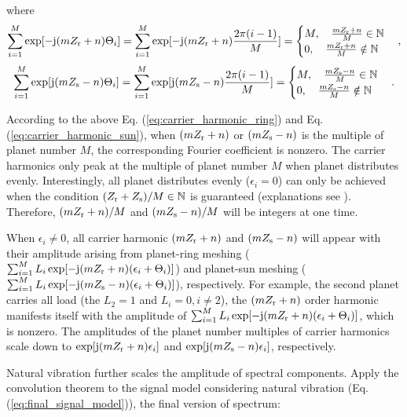 \documentclass[a4paper,fleqn]{cas-sc}%
\begin{document}
where
\begin{equation}
        \sum_{i=1}^{M} \exp[-{\rm j} (m Z_{\rm r} + n)\Theta_i]=\sum_{i=1}^{M} \exp[-{\rm j}(m Z_{\rm r}+n)\frac{2 \pi (i-1)}{M}]=\begin{cases}
            M, \quad \frac{m Z_{\rm r}+n}{M} \in \mathbb{N}\\
            0, \quad \frac{m Z_{\rm r}+n}{M} \notin \mathbb{N}
        \end{cases},\label{eq:carrier_harmonic_ring}
\end{equation}
\begin{equation}
    \sum_{i=1}^{M} \exp[{\rm j} (m Z_{\rm s} - n)\Theta_i]=\sum_{i=1}^{M} \exp[{\rm j}(m Z_{\rm s}-n)\frac{2 \pi (i-1)}{M}]=\begin{cases}
         M, \quad \frac{m Z_{\rm s}-n}{M} \in \mathbb{N}\\
        0, \quad \frac{m Z_{\rm s}-n}{M} \notin \mathbb{N}
    \end{cases}.\label{eq:carrier_harmonic_sun}
\end{equation}
\par According to the above Eq. (\ref{eq:carrier_harmonic_ring}) and Eq. (\ref{eq:carrier_harmonic_sun}), when $(m Z_{\rm r}+n)$ or $(m Z_{\rm s}-n)$ is the multiple of planet number $M$, the corresponding Fourier coefficient is nonzero. The carrier harmonics only peak at the multiple of planet number $M$ when planet distributes evenly. Interestingly, all planet distributes evenly ($\epsilon_i=0$) can only be achieved when the condition $(Z_{\rm r}+Z_{\rm s})/M \in \mathbb{N}$ is guaranteed (explanations see ). Therefore, $(m Z_{\rm r}+n)/M$ and $(m Z_{\rm s}-n)/M$ will be integers at one time. 
\par When $\epsilon_i \neq 0$, all carrier harmonic $(m Z_{\rm r} + n)$ and $(m Z_{\rm s} - n)$ will appear with their amplitude arising from planet-ring meshing ($\sum_{i=1}^{M} L_i \exp[-{\rm j} (m Z_{\rm r} + n)(\epsilon_i+\Theta_i)]$) and planet-sun meshing ($\sum_{i=1}^{M} L_i \exp[-{\rm j} (m Z_{\rm s} - n)(\epsilon_i+\Theta_i)]$), respectively. For example, the second planet carries all load (the $L_2=1$ and $L_i=0,i\neq2$), the $(m Z_{\rm r} + n)$ order harmonic manifests itself with the amplitude of $\sum_{i=1}^{M} L_i \exp[-{\rm j} (m Z_{\rm r} + n)(\epsilon_i+\Theta_i)]$, which is nonzero. The amplitudes of the planet number multiples of carrier harmonics scale down to $\exp[{\rm j}(m Z_{\rm r}+n)\epsilon_i]$ and $\exp[{\rm j}(m Z_{\rm s}-n)\epsilon_i]$, respectively.
\par Natural vibration further scales the amplitude of spectral components. Apply the convolution theorem to the signal model considering natural vibration (Eq. (\ref{eq:final_signal_model})), the final version of spectrum:
\end{document}
